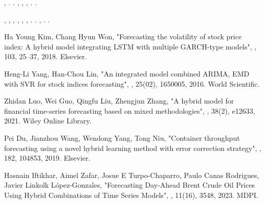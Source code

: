 \documentclass[sn-mathphys,Numbered]{sn-jnl}
\theoremstyle{thmstyleone}%
\theoremstyle{thmstyletwo}%
\theoremstyle{thmstylethree}%
\begin{document}
\begin{thebibliography}{100}
,
.
\newblock {}.
\newblock {}, , , .
\newblock {}.



, , , , , ,
.
\newblock {}.
\newblock {} , . .


Ha Young Kim, Chang Hyun Won,
\newblock "Forecasting the volatility of stock price index: A hybrid model integrating LSTM with multiple GARCH-type models",
, 103, 25--37, 2018. Elsevier.

Heng-Li Yang, Han-Chou Lin,
\newblock "An integrated model combined ARIMA, EMD with SVR for stock indices forecasting",
, 25(02), 1650005, 2016. World Scientific.


Zhidan Luo, Wei Guo, Qingfu Liu, Zhengjun Zhang,
\newblock "A hybrid model for financial time-series forecasting based on mixed methodologies",
, 38(2), e12633, 2021. Wiley Online Library.



Pei Du, Jianzhou Wang, Wendong Yang, Tong Niu,
\newblock "Container throughput forecasting using a novel hybrid learning method with error correction strategy",
, 182, 104853, 2019. Elsevier.


Hasnain Iftikhar, Aimel Zafar, Josue E Turpo-Chaparro, Paulo Canas Rodrigues, Javier Linkolk López-Gonzales,
\newblock "Forecasting Day-Ahead Brent Crude Oil Prices Using Hybrid Combinations of Time Series Models",
, 11(16), 3548, 2023. MDPI.



\end{thebibliography}
\end{document}
